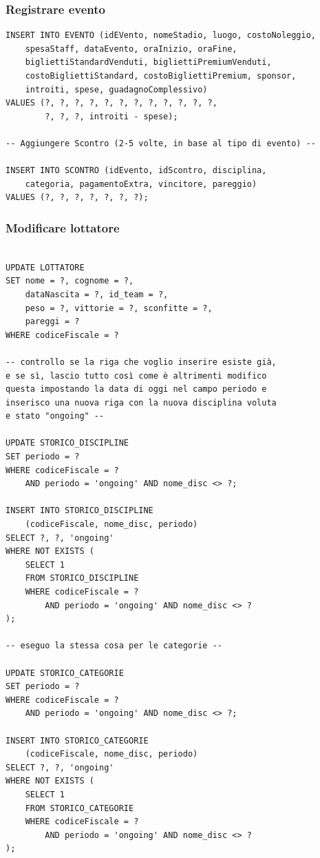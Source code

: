 \documentclass[a4paper,12pt]{report}
\begin{document}
\subsubsection{Registrare evento}
\begin{verbatim}
INSERT INTO EVENTO (idEVento, nomeStadio, luogo, costoNoleggio,
    spesaStaff, dataEvento, oraInizio, oraFine, 
    bigliettiStandardVenduti, bigliettiPremiumVenduti, 
    costoBigliettiStandard, costoBigliettiPremium, sponsor, 
    introiti, spese, guadagnoComplessivo)
VALUES (?, ?, ?, ?, ?, ?, ?, ?, ?, ?, ?, ?, 
        ?, ?, ?, introiti - spese);

-- Aggiungere Scontro (2-5 volte, in base al tipo di evento) --

INSERT INTO SCONTRO (idEvento, idScontro, disciplina, 
    categoria, pagamentoExtra, vincitore, pareggio)
VALUES (?, ?, ?, ?, ?, ?, ?);

\end{verbatim}
\subsubsection{Modificare lottatore}
\begin{verbatim}

UPDATE LOTTATORE 
SET nome = ?, cognome = ?,
    dataNascita = ?, id_team = ?, 
    peso = ?, vittorie = ?, sconfitte = ?,
    pareggi = ?
WHERE codiceFiscale = ?

-- controllo se la riga che voglio inserire esiste già, 
e se sì, lascio tutto così come è altrimenti modifico 
questa impostando la data di oggi nel campo periodo e 
inserisco una nuova riga con la nuova disciplina voluta 
e stato "ongoing" --

UPDATE STORICO_DISCIPLINE
SET periodo = ?
WHERE codiceFiscale = ? 
    AND periodo = 'ongoing' AND nome_disc <> ?;

INSERT INTO STORICO_DISCIPLINE 
    (codiceFiscale, nome_disc, periodo)
SELECT ?, ?, 'ongoing'
WHERE NOT EXISTS (
    SELECT 1
    FROM STORICO_DISCIPLINE
    WHERE codiceFiscale = ?
        AND periodo = 'ongoing' AND nome_disc <> ?
);

-- eseguo la stessa cosa per le categorie --

UPDATE STORICO_CATEGORIE
SET periodo = ?
WHERE codiceFiscale = ? 
    AND periodo = 'ongoing' AND nome_disc <> ?;

INSERT INTO STORICO_CATEGORIE 
    (codiceFiscale, nome_disc, periodo)
SELECT ?, ?, 'ongoing'
WHERE NOT EXISTS (
    SELECT 1
    FROM STORICO_CATEGORIE
    WHERE codiceFiscale = ?
        AND periodo = 'ongoing' AND nome_disc <> ?
);
    
\end{verbatim}
\end{document}
